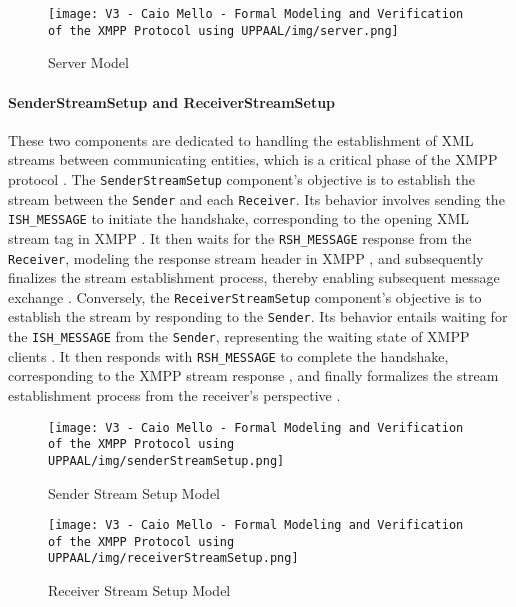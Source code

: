 \begin{figure}[h]
 \centering
 \texttt{[image: V3 - Caio Mello - Formal Modeling and Verification of the XMPP Protocol using UPPAAL/img/server.png]} 
 \caption{Server Model}
 \label{fig:server}
\end{figure}

\paragraph{SenderStreamSetup and ReceiverStreamSetup}
These two components are dedicated to handling the establishment of XML streams between communicating entities, which is a critical phase of the XMPP protocol \cite{rfc6120}. The \texttt{SenderStreamSetup} component's objective is to establish the stream between the \texttt{Sender} and each \texttt{Receiver}. Its behavior involves sending the \texttt{ISH\_MESSAGE} to initiate the handshake, corresponding to the opening XML stream tag in XMPP \cite{meijer2005jabber}. It then waits for the \texttt{RSH\_MESSAGE} response from the \texttt{Receiver}, modeling the response stream header in XMPP \cite{rfc6120}, and subsequently finalizes the stream establishment process, thereby enabling subsequent message exchange \cite{waher2015learning}. Conversely, the \texttt{ReceiverStreamSetup} component's objective is to establish the stream by responding to the \texttt{Sender}. Its behavior entails waiting for the \texttt{ISH\_MESSAGE} from the \texttt{Sender}, representing the waiting state of XMPP clients \cite{adams2002xep}. It then responds with \texttt{RSH\_MESSAGE} to complete the handshake, corresponding to the XMPP stream response \cite{rfc6120}, and finally formalizes the stream establishment process from the receiver's perspective \cite{meijer2005jabber}.

\begin{figure}[h]
 \centering
 \texttt{[image: V3 - Caio Mello - Formal Modeling and Verification of the XMPP Protocol using UPPAAL/img/senderStreamSetup.png]} 
 \caption{Sender Stream Setup Model}
 \label{fig:senderStreamSetup}
\end{figure}

\begin{figure}[h]
 \centering
 \texttt{[image: V3 - Caio Mello - Formal Modeling and Verification of the XMPP Protocol using UPPAAL/img/receiverStreamSetup.png]} 
 \caption{Receiver Stream Setup Model}
 \label{fig:receiverStreamSetup}
\end{figure}

